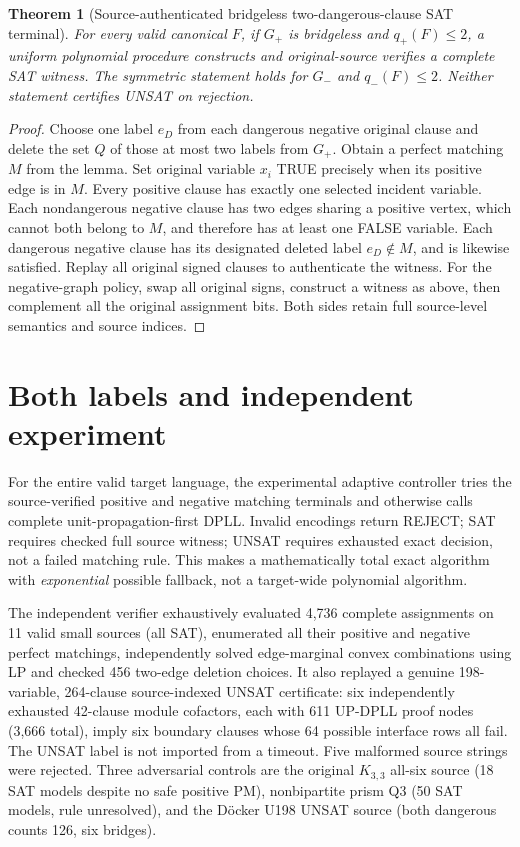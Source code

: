 \documentclass[11pt]{article}
\newtheorem{theorem}{Theorem}
\begin{document}
\begin{theorem}[Source-authenticated bridgeless two-dangerous-clause SAT terminal]
For \emph{every valid canonical} $F$, if $G_+$ is bridgeless and $q_+(F)\le2$, a uniform polynomial procedure constructs and original-source verifies a complete SAT witness. The symmetric statement holds for $G_-$ and $q_-(F)\le2$. Neither statement certifies UNSAT on rejection.
\end{theorem}
\begin{proof}
Choose one label $e_D$ from each dangerous negative original clause and delete the set $Q$ of those at most two labels from $G_+$. Obtain a perfect matching $M$ from the lemma. Set original variable $x_i$ TRUE precisely when its positive edge is in $M$. Every positive clause has exactly one selected incident variable. Each nondangerous negative clause has two edges sharing a positive vertex, which cannot both belong to $M$, and therefore has at least one FALSE variable. Each dangerous negative clause has its designated deleted label $e_D\notin M$, and is likewise satisfied. Replay all original signed clauses to authenticate the witness. For the negative-graph policy, swap all original signs, construct a witness as above, then complement all the original assignment bits. Both sides retain full source-level semantics and source indices.
\end{proof}

\section{Both labels and independent experiment}
For the entire valid target language, the experimental adaptive controller tries the source-verified positive and negative matching terminals and otherwise calls complete unit-propagation-first DPLL. Invalid encodings return REJECT; SAT requires checked full source witness; UNSAT requires exhausted exact decision, not a failed matching rule. This makes a mathematically total exact algorithm with \emph{exponential} possible fallback, not a target-wide polynomial algorithm.

The independent verifier exhaustively evaluated 4,736 complete assignments on 11 valid small sources (all SAT), enumerated all their positive and negative perfect matchings, independently solved edge-marginal convex combinations using LP and checked 456 two-edge deletion choices. It also replayed a genuine 198-variable, 264-clause source-indexed UNSAT certificate: six independently exhausted 42-clause module cofactors, each with 611 UP-DPLL proof nodes (3,666 total), imply six boundary clauses whose 64 possible interface rows all fail. The UNSAT label is not imported from a timeout. Five malformed source strings were rejected. Three adversarial controls are the original $K_{3,3}$ all-six source (18 SAT models despite no safe positive PM), nonbipartite prism Q3 (50 SAT models, rule unresolved), and the Döcker U198 UNSAT source (both dangerous counts 126, six bridges).
\end{document}
